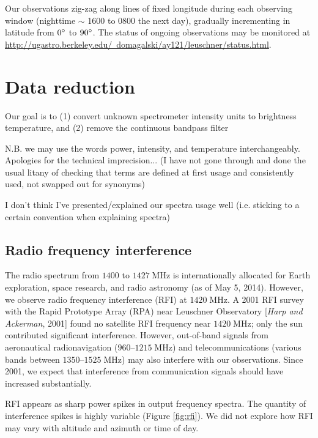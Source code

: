 \documentclass[10pt]{article}
\newcommand {\mt}{\mathrm}
\newcommand {\unit}[1]{\; \mt{#1}}
\begin{document}
Our observations zig-zag along lines of fixed longitude during each observing window (nighttime $\sim$ 1600 to 0800 the next day), gradually incrementing in latitude from $0\degree$ to $90\degree$.  The status of ongoing observations may be monitored at
\href{http://ugastro.berkeley.edu/~domagalski/ay121/leuschner/status.html}
{http://ugastro.berkeley.edu/~domagalski/ay121/leuschner/status.html}.

\section{Data reduction}

Our goal is to (1) convert unknown spectrometer intensity units to brightness temperature, and (2) remove the continuous bandpass filter

N.B. we may use the words power, intensity, and temperature interchangeably.  Apologies for the technical imprecision...  (I have not gone through and done the usual litany of checking that terms are defined at first usage and consistently used, not swapped out for synonyms)

I don't think I've presented/explained our spectra usage well (i.e. sticking to a certain convention when explaining spectra)

\subsection{Radio frequency interference}

The radio spectrum from $1400$ to $1427 \unit{MHz}$ is internationally allocated for Earth exploration, space research, and radio astronomy (as of May 5, 2014).  However, we observe radio frequency interference (RFI) at $1420\unit{MHz}$.  A 2001 RFI survey with the Rapid Prototype Array (RPA) near Leuschner Observatory [\textit{Harp and Ackerman}, 2001] found no satellite RFI frequency near $1420 \unit{MHz}$; only the sun contributed significant interference.  However, out-of-band signals from aeronautical radionavigation ($960$--$1215\unit{MHz}$) and telecommunications (various bands between $1350$--$1525\unit{MHz}$) may also interfere with our observations.  Since 2001, we expect that interference from communication signals should have increased substantially.

RFI appears as sharp power spikes in output frequency spectra.  The quantity of interference spikes is highly variable (Figure \ref{fig:rfi}).  We did not explore how RFI may vary with altitude and azimuth or time of day.
\end{document}
